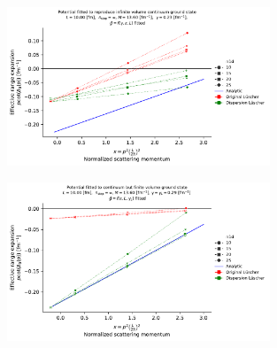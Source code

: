 \documentclass[
    aps,
    prl,
    showkeys,
    nofootinbib,
    floatfix
]{revtex4-1}
\begin{document}
\begin{figure}[!htb]
\includegraphics[width=0.7\textwidth]{figs/long-range-ere-v-fit.pdf}
\caption{
	\label{fig:long-range-ere-v-fit}
}
\end{figure}

\begin{figure}[!htb]
\includegraphics[width=0.7\textwidth]{figs/long-range-ere-v-lat.pdf}
\caption{
	\label{fig:long-range-ere-v-lat}
}
\end{figure}
\end{document}
